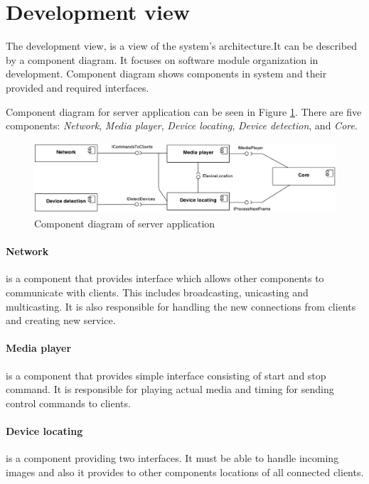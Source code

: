 \section{Development view}
The development view, is a view of  the system's architecture.It can be described by a component diagram.
It focuses on software module organization in development.
Component diagram shows components in system and their provided and required interfaces.

Component diagram for server application can be seen in Figure \ref{fig:component_diagram_server}.
There are five components: \emph{Network}, \emph{Media player},  \emph{Device locating}, \emph{Device detection}, and \emph{Core}.

\begin{figure}[h]
	\centering
		\includegraphics[width=16.2cm]{softwareArchitecture/component_diagram.pdf}
	\caption{Component diagram of server application}
	\label{fig:component_diagram_server}
\end{figure}

\paragraph{Network} is a component that provides interface which allows other components to communicate with clients. 
This includes broadcasting, unicasting and multicasting. 
It is also responsible for handling the new connections from clients and creating new service.

\paragraph{Media player} is a component that provides simple interface consisting of start and stop command. 
It is responsible for playing actual media and timing for sending control commands to clients.

\paragraph{Device locating} is a component providing two interfaces. 
It must be able to handle incoming images and also it provides to other components locations of all connected clients.


